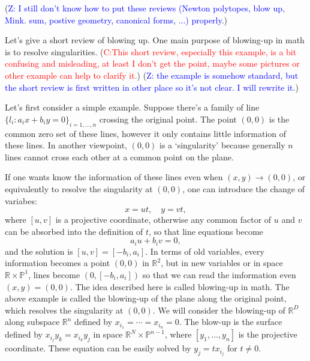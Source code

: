 \documentclass[12pt]{article}
\theoremstyle{definition}
\theoremstyle{plain}
\begin{document}
(\textcolor{blue}{Z: I still don't know how to put these reviews (Newton polytopes, blow up, Mink. sum, postive
geometry, canonical forms, ...) properly}.)

Let's give a short review of blowing up. 
One main purpose of blowing-up in math is to resolve singularities. (\textcolor{red}{C:This short review, especially this example, is a bit confusing and misleading, at least I don't get the point, maybe some pictures or other example can help to clarify it.})
(\textcolor{blue}{Z: the example is somehow standard, but the short review is first written 
in other place so it's not clear. I will rewrite it.})

Let's first consider a simple example. 
Suppose there's a family of line $\{l_i: a_ix+b_iy=0\}_{i=1,\dots,n}$ crossing 
the original point. The point $(0,0)$ is the common zero set of these lines,
however it only contains little information of these lines. In another viewpoint,
$(0,0)$ is a `singularity' because generally $n$ lines cannot cross each other 
at a common point on the plane. 

If one wants know the information of these lines even when $(x,y)\to (0,0)$, 
or equivalently to resolve the singularity at $(0,0)$, one can introduce the 
change of variabes:
\[
	x=ut,\quad y=vt,
\] 
where $[u,v]$ is a projective coordinate, otherwise any common factor of $u$ and $v$ can be 
absorbed into the definition of $t$, so that line equations become 
\[
	a_i u + b_i v = 0,
\]
and the solution is $[u,v]=[-b_i,a_i]$. In terms of old variables, every information 
becomes a point $(0,0)$ in $\mathbb R^2$, but in new variables or in space 
$\mathbb R\times \mathbb P^1$, lines become $(0,[-b_i,a_i])$ so that 
we can read the imformation even $(x,y)=(0,0)$. 
The idea described here is called blowing-up in math.  
The above example is called the blowing-up of the plane along the original point, which 
resolves the singularity at $(0,0)$. We will consider the blowing-up of $\mathbb R^D$
along subspace $\mathbb R^n$ defined by $x_{i_1}=\cdots=x_{i_n}=0$. 
The blow-up is the surface defined by $x_{i_j}y_k=x_{i_k}y_j$ in space 
$\mathbb R^{N}\times \mathbb P^{n-1}$,
where $[y_1,\dots,y_n]$ is the projective coordinate. These equation can be easily
solved by $y_j=tx_{i_j}$ for $t\neq 0$.
\end{document}

